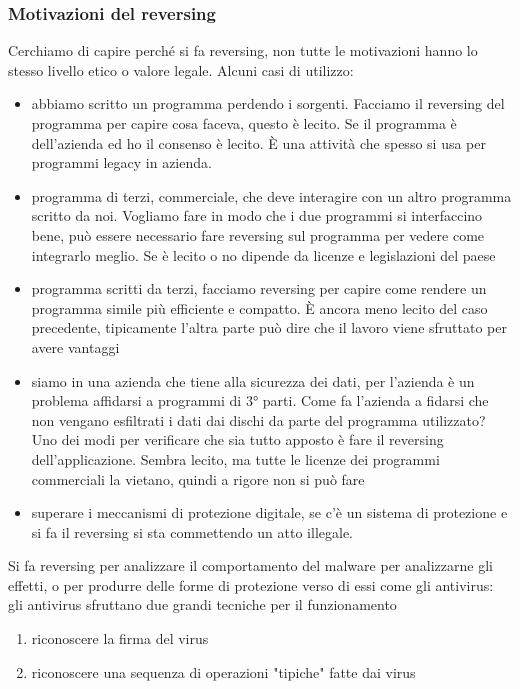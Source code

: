 \documentclass{article}
\begin{document}
\subsubsection{Motivazioni del reversing}
Cerchiamo di capire perché si fa reversing, non tutte le motivazioni hanno lo stesso livello etico o valore legale. Alcuni casi di utilizzo:
\begin{itemize}
\item abbiamo scritto un programma perdendo i sorgenti. Facciamo il reversing del programma per capire cosa faceva, questo è lecito. Se il programma è dell'azienda ed ho il consenso è lecito. È una attività che spesso si usa per programmi legacy in azienda.
\item programma di terzi, commerciale, che deve interagire con un altro programma scritto da noi. Vogliamo fare in modo che i due programmi si interfaccino bene, può essere necessario fare reversing sul programma per vedere come integrarlo meglio. Se è lecito o no dipende da licenze e legislazioni del paese
\item programma scritti da terzi, facciamo reversing per capire come rendere un programma simile più efficiente e compatto. È ancora meno lecito del caso precedente, tipicamente l'altra parte può dire che il lavoro viene sfruttato per avere vantaggi
\item siamo in una azienda che tiene alla sicurezza dei dati, per l'azienda è un problema affidarsi a programmi di 3° parti. Come fa l'azienda a fidarsi che non vengano esfiltrati i dati dai dischi da parte del programma utilizzato? Uno dei modi per verificare che sia tutto apposto è fare il reversing dell'applicazione. Sembra lecito, ma tutte le licenze dei programmi commerciali la vietano, quindi a rigore non si può fare
\item superare i meccanismi di protezione digitale, se c'è un sistema di protezione e si fa il reversing si sta commettendo un atto illegale.
\end{itemize}
Si fa reversing per analizzare il comportamento del malware per analizzarne gli effetti, o per produrre delle forme di protezione verso di essi come gli antivirus: gli antivirus sfruttano due grandi tecniche per il funzionamento
\begin{enumerate}
\item riconoscere la firma del virus
\item riconoscere una sequenza di operazioni "tipiche" fatte dai virus 
\end{enumerate}
\end{document}
